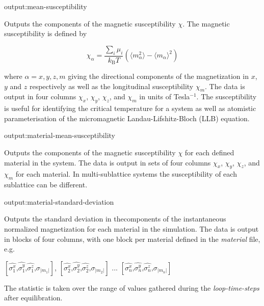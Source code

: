 {\zicf output:mean-susceptibility} Outputs the components of the magnetic susceptibility $\chi$. The magnetic susceptibility is defined by

\begin{equation*}
\chi_{\alpha} = \frac{\sum_i \mu_i}{k_{\mathrm{B}}T}\left(\langle m_{\alpha}^2\rangle - \langle m_{\alpha}\rangle^2 \right)
\end{equation*}

\noindent where $\alpha = x,y,z,m$ giving the directional components of the magnetization in $x$, $y$ and $z$ respectively as well as the longitudinal susceptibility $\chi_m$. The data is output in four columns $\chi_x$, $\chi_y$, $\chi_z$, and $\chi_m$ in units of Tesla$^{-1}$. The susceptibility is useful for identifying the critical temperature for a system as well as atomistic parameterisation of the micromagnetic
Landau-Lifshitz-Bloch (LLB) equation.

{\zicf output:material-mean-susceptibility} Outputs
the components of the magnetic susceptibility $\chi$ for each defined material in the system. The data is output in sets of
four columns $\chi_x$, $\chi_y$, $\chi_z$, and $\chi_m$ for each material. In multi-sublattice systems the susceptibility of
each sublattice can be different.

{\zicf output:material-standard-deviation} Outputs the standard deviation in the\newline components of the instantaneous normalized magnetization for each material in the simulation. The data is output in blocks of four columns, with one block per material defined in the \textit{material} file, e.g.

\begin{center}
$\left[ \hat{\sigma_1^x} \textrm{,} \hat{\sigma_1^y} \textrm{,} \hat{\sigma_1^z} \textrm{,} \sigma_{|m_1|} \right]$,
$\left[ \hat{\sigma_2^x} \textrm{,} \hat{\sigma_2^y} \textrm{,} \hat{\sigma_2^z} \textrm{,} \sigma_{|m_2|} \right]$ ...
$\left[ \hat{\sigma_n^x} \textrm{,} \hat{\sigma_n^y} \textrm{,} \hat{\sigma_n^z} \textrm{,} \sigma_{|m_n|} \right]$
\end{center}

The statistic is taken over the range of values gathered during the \textit{loop-time-steps} after equilibration.

